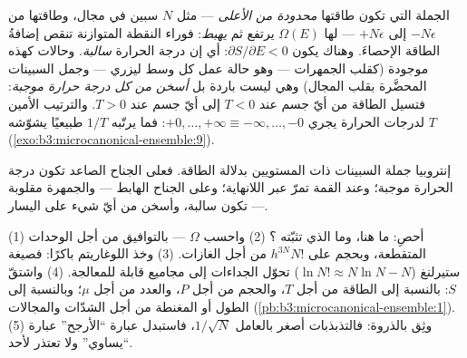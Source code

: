 \begin{example}\label{ex:b3:microcanonical-ensemble:negative}
الجملة التي تكون طاقتها \emph{محدودة من الأعلى} --- مثل $N$ سبين في
مجال، وطاقتها من $-N\epsilon$ إلى $+N\epsilon$ --- لها $\Omega(E)$
يرتفع ثم \emph{يهبط}: فوراء النقطة المتوازنة تنقص إضافةُ الطاقة
الإحصاءَ. وهناك يكون $\partial S/\partial E < 0$: أي إن
درجة الحرارة \emph{سالبة}. وحالات كهذه موجودة (كقلب
الجمهرات --- وهو حالة عمل كل وسط ليزري --- وجمل
السبينات المحضَّرة بقلب المجال) وهي ليست باردة بل
\emph{أسخن من كل درجة حرارة موجبة}: فتسيل الطاقة من أيّ
جسم عند $T < 0$ إلى أيّ جسم عند $T > 0$. والترتيب الأمين
لدرجات الحرارة يجري $+0, \dots, +\infty \equiv -\infty, \dots, -0$:
فما يرتّبه $1/T$ طبيعيًا يشوّشه $T$
(\cref{exo:b3:microcanonical-ensemble:9}).
\end{example}

\begin{omfigure}

{\small إنتروبيا جملة السبينات ذات المستويين بدلالة الطاقة. فعلى
الجناح الصاعد تكون درجة الحرارة موجبة؛ وعند القمة تمرّ عبر
اللانهاية؛ وعلى الجناح الهابط --- والجمهرة مقلوبة --- تكون
سالبة، وأسخن من أيّ شيء على اليسار.}
\end{omfigure}

\begin{method}\label{met:b3:microcanonical-ensemble:method}
(1) أحصِ: ما  هنا، وما الذي تثبّته ؟ (2) واحسب $\Omega$ --- بالتوافيق من أجل الوحدات
المتقطعة، وبحجم  على $h^{3N}N!$ من أجل الغازات. (3) وخذ
اللوغاريتم باكرًا: فصيغة ستيرلنغ ($\ln N! \approx N\ln N - N$) تحوّل
الجداءات إلى مجاميع قابلة للمعالجة. (4) واشتقّ $S$: بالنسبة إلى
الطاقة من أجل $T$، والحجم من أجل $P$، والعدد من أجل $\mu$؛ وبالنسبة إلى الطول أو
المغنطة من أجل الشدّات والمجالات
(\cref{pb:b3:microcanonical-ensemble:1}). (5) وثِق بالذروة:
فالتذبذبات أصغر بالعامل $1/\sqrt N$، فاستبدل عبارة ``الأرجح''
عبارة ``يساوي'' ولا تعتذر لأحد.
\end{method}

